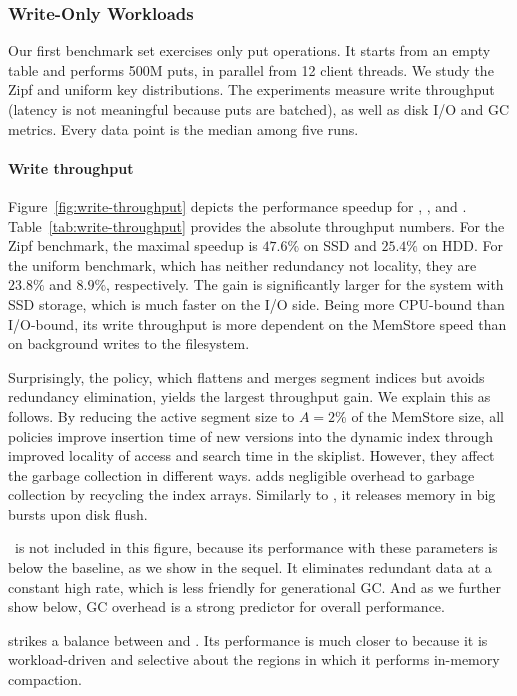 \subsubsection{Write-Only Workloads}

Our first benchmark set exercises only put operations. It starts from an empty table and performs 500M puts, 
in parallel from 12 client threads. We study the Zipf and  uniform key distributions. The experiments measure
write throughput (latency is not meaningful because puts are batched), as well as disk I/O and GC metrics. 
Every data point is the median among five runs. 

\paragraph{Write throughput} 
Figure~\ref{fig:write-throughput} depicts the performance speedup for
\none, \basic, and \adp. Table~\ref{tab:write-throughput} provides the absolute throughput numbers. 
For the Zipf benchmark, the maximal speedup is $47.6\%$ on SSD and $25.4\%$ on HDD. For the uniform benchmark, 
which has neither redundancy not locality, they are $23.8\%$ and $8.9\%$, respectively. 
The gain is significantly larger for the system with SSD storage, 
which is much faster on the I/O side. Being more CPU-bound than I/O-bound, its write throughput is more dependent on 
the MemStore speed than on background writes to the filesystem.  

Surprisingly, the \basic\/ policy, which flattens and merges segment indices but avoids 
redundancy elimination, yields the largest throughput gain. We explain this as follows. By reducing the active 
segment size to $A=2$\% of the MemStore size, all \sys\/ policies improve insertion time of new versions 
into the dynamic index through improved locality of access and search time in the skiplist. However, 
they affect the garbage collection in different ways. \basic\/ adds negligible overhead to 
garbage collection by recycling the index arrays. Similarly to \none, it releases memory in big bursts
upon disk flush. 

\eager\ is not included in this figure, because its performance with these parameters is below the baseline, as we show in the sequel.
It eliminates redundant data at a constant high rate,
which is less friendly for generational GC. And as we further show below, GC overhead is a strong predictor for 
overall 
performance. 

\adp\/ strikes a balance between \basic\/ and \eager. Its performance is much closer to \basic\/ 
because it is workload-driven and selective about the regions in which it performs in-memory compaction.  



